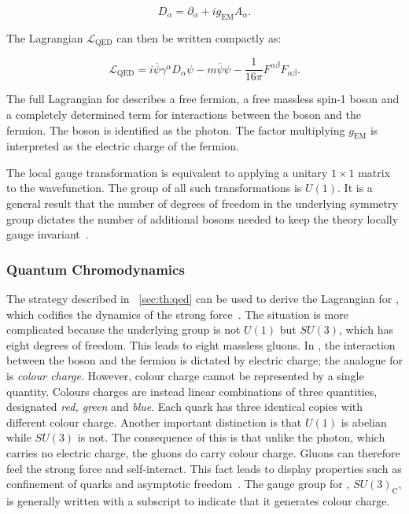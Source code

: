 \begin{equation}
\label{eq:th:covariant_derivative}
D_{\alpha} = \partial_{\alpha} + i g_{\textrm{EM}}A_{\alpha}.
\end{equation}

The Lagrangian $\mathcal{L}_{\textrm{QED}}$ can then be written compactly as:

\begin{equation}
\label{eq:th:QED_lagrangian}
\mathcal{L}_{\textrm{QED}} = i\overline{\psi} \gamma^{\alpha} D_{\alpha} \psi - m\overline{\psi}\psi -\frac{1}{16\pi} F^{\alpha\beta}F_{\alpha\beta}.
\end{equation}

The full Lagrangian for \QED describes a free fermion, a free massless spin-1 boson and a completely determined term for interactions between the boson and the fermion. The boson is identified as the photon. The factor multiplying $g_{\textrm{EM}}$ is interpreted as the electric charge of the fermion.

The local gauge transformation is equivalent to applying a unitary $1\times1$ matrix to the wavefunction. The group of all such transformations is $U(1)$. It is a general result that the number of degrees of freedom in the underlying symmetry group dictates the number of additional bosons needed to keep the theory locally gauge invariant~\cite{griffiths2008introduction}. 

\subsubsection{Quantum Chromodynamics}

The strategy described in \Sec~\ref{sec:th:qed} can be used to derive the Lagrangian for \QCD, which codifies the dynamics of the strong force~\cite{griffiths2008introduction}.  %
The situation is more complicated because the underlying group is not $U(1)$ but $SU(3)$, which has eight degrees of freedom. This leads to eight massless gluons. In \QED, the interaction between the boson and the fermion is dictated by electric charge; the analogue for \QCD is \emph{colour charge}. However, colour charge cannot be represented by a single quantity. Colours charges are instead linear combinations of three quantities, designated \emph{red, green} and \emph{blue}. Each \SM quark has three identical copies with different colour charge. Another important distinction is that $U(1)$ is abelian while $SU(3)$ is not. The consequence of this is that unlike the \QED photon, which carries no electric charge, the \QCD gluons do carry colour charge. Gluons can therefore feel the strong force and self-interact. This fact leads \QCD to display properties such as confinement of quarks and asymptotic freedom~\cite{PhysRevLett.30.1346,PhysRevLett.30.1343}. The gauge group for \QCD, $SU(3)_{\textrm{C}}$, is generally written with a subscript to indicate that it generates colour charge. 


